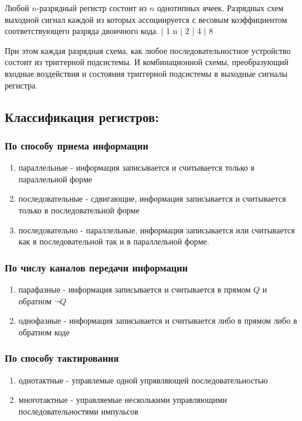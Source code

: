 \documentclass[a4paper]{article}
\begin{document}
Любой $n$-разрядный регистр состоит из $n$ однотипных ячеек. Разрядных схем выходной сигнал каждой из которых ассоциируется с весовым коэффициентом соответствующего разряда двоичного кода.
   | 1
n  | 2
   | 4
   | 8

При этом каждая разрядная схема, как любое последовательностное устройство состоит из триггерной подсистемы.
И комбинационной схемы, преобразующий входные воздействия и состояния триггерной подсистемы в выходные сигналы регистра.

\subsection{Классификация регистров:}

\subsubsection{По способу приема информации}
\begin{enumerate}
    \item параллельные - информация записывается и считывается только в параллельной форме
    \item последовательные - сдвигающие, информация записывается и считывается только в последовательной форме
    \item последовательно - параллельные, информация записывается или считывается как в последовательной так и в параллельной форме.
\end{enumerate}

\subsubsection{По числу каналов передачи информации}
\begin{enumerate}
    \item парафазные - информация записывается и считывается в прямом $Q$ и обратном $\neg Q$
    \item однофазные - информация записывается и считывается либо в прямом либо в обратном коде
\end{enumerate}

\subsubsection{По способу тактирования}
\begin{enumerate}
    \item однотактные - управлемые одной упрявляющей последовательностью
    \item многотактные - управляемые несколькими управляющими последовательностями импульсов
\end{enumerate}
\end{document}

